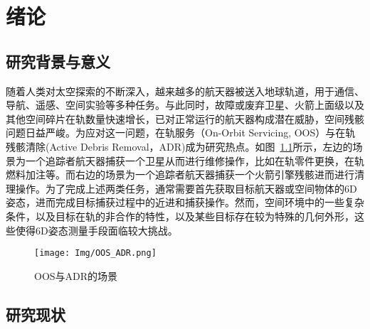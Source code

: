 \chapter{绪论}

\section{研究背景与意义}
随着人类对太空探索的不断深入，越来越多的航天器被送入地球轨道，用于通信、导航、遥感、空间实验等多种任务\cite{prol2022position,zhao2022overview,nozawa2023extent}。与此同时，故障或废弃卫星、火箭上面级以及其他空间碎片在轨数量快速增长，已对正常运行的航天器构成潜在威胁，空间残骸问题日益严峻\cite{debris1,debris2}。为应对这一问题，在轨服务（On-Orbit Servicing, OOS）\cite{ma2023advances,nwac129,asri2024introductory,wang2023bridging}与在轨残骸清除(Active Debris Removal，ADR)成为研究热点\cite{BARANOV2024100982,CREASER2024481,BAREA20243060,WANG2025}。如图~\ref{fig:OOS_ADR}所示，左边的场景为一个追踪者航天器捕获一个卫星从而进行维修操作，比如在轨零件更换，在轨燃料加注等。而右边的场景为一个追踪者航天器捕获一个火箭引擎残骸进而进行清理操作。为了完成上述两类任务，通常需要首先获取目标航天器或空间物体的6D姿态，进而完成目标捕获过程中的近进和捕获操作。然而，空间环境中的一些复杂条件\cite{aerospace10120997}，以及目标在轨的非合作的特性\cite{PAULY2023339}，以及某些目标存在较为特殊的几何外形，这些使得6D姿态测量手段面临较大挑战。
\begin{figure}[htbp]
	\centering
	\texttt{[image: Img/OOS\_ADR.png]}
	\caption{OOS与ADR的场景}
	\label{fig:OOS_ADR}
\end{figure}

\section{研究现状}
